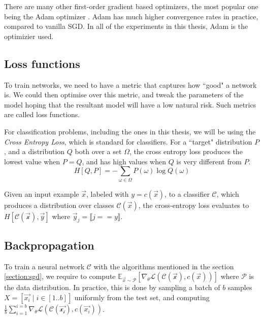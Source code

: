 \documentclass{ociamthesis}
\begin{document}
There are many other first-order gradient based optimizers, the most popular one
being the Adam optimizer \citep{Adam}. Adam has much higher convergence rates in
practice, compared to vanilla SGD. In all of the experiments in this thesis,
Adam is the optimizier used. %

\subsection{Loss functions}
To train networks, we need to have a metric that captures how ``good" a network
is. We could then optimise over this metric, and tweak the parameters of the
model hoping that the resultant model will have a low natural risk. Such metrics
are called loss functions.

For classification problems, including the ones in this thesis, we will be using
the \emph{Cross Entropy Loss}, which is standard for classifiers. For a ``target"
distribution $P$, and a distribution $Q$ both over a set $\Omega$, the cross
entropy loss produces the lowest value when $P=Q$, and has high values when $Q$
is very different from $P$.
\begin{equation*}
    H[Q, P] = -\sum_{\omega \in \Omega} P(\omega) \log Q(\omega)
\end{equation*}

Given an input example $\vec{x}$, labeled with $y=c(\vec{x})$, to a classifier
$\mathcal{C}$, which produces a distribution over classes
$\mathcal{C}(\vec{x})$, the cross-entropy loss evaluates to
$H[\mathcal{C(\mathcal{\vec{x}})}, \vec{y}]$ where $\vec{y}_j=\llbracket j == y
\rrbracket$.

\subsection{Backpropagation}
To train a neural network $\mathcal{C}$ with the algorithms mentioned in the
section \ref{section:sgd}, we require to compute $\mathbb{E}_{\vec{x} \sim
\mathcal{P}}[\nabla_\theta \mathcal{L}(\mathcal{C(\vec{x})}, c(\vec{x}))]$ where
$\mathcal{P}$ is the data distribution. In practice, this is done by sampling a
batch of $b$ samples $X=[\vec{x_i}\mid i \in [1..b]]$ uniformly from the test
set, and computing $\frac{1}{b} \sum_{i=1}^{i=b} \nabla_\theta
\mathcal{L}(\mathcal{C(\vec{x_i})}, c(\vec{x_i}))$.
\end{document}
